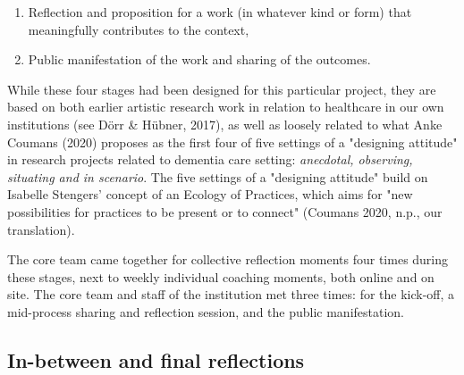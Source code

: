 \documentclass[authordate, empirical,issue]{jote-new-article}
\begin{document}
{\begin{enumerate}
		\item Reflection and proposition for a work (in whatever kind or form) that meaningfully contributes to the context,



		\item Public manifestation of the work and sharing of the outcomes.


	\end{enumerate}





	While these four stages had been designed for this particular project, they are based on both earlier artistic research work in relation to healthcare in our own institutions (see Dörr \& Hübner, 2017), as well as loosely related to what Anke Coumans (2020) proposes as the first four of five settings of a "designing attitude" in research projects related to dementia care setting: \emph{anecdotal, observing, situating and in scenario}. The five settings of a "designing attitude" build on Isabelle Stengers' concept of an Ecology of Practices, which aims for "new possibilities for practices to be present or to connect" (Coumans 2020, n.p., our translation).



	The core team came together for collective reflection moments four times during these stages, next to weekly individual coaching moments, both online and on site. The core team and staff of the institution met three times: for the kick-off, a mid-process sharing and reflection session, and the public manifestation.



	}



	\subsection{In-between and final reflections}
\end{document}
